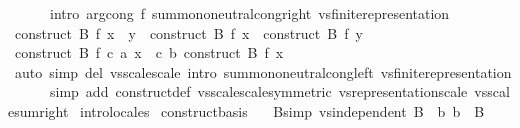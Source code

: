 \begin{isabellebody}
\ \ \ \ \ \ intro{\isacharbang}{\kern0pt}{\isacharcolon}{\kern0pt}\ arg{\isacharunderscore}{\kern0pt}cong{}{\isacharbrackleft}{\kern0pt}\ f{\isacharequal}{\kern0pt}{\isachardoublequoteopen}{\isacharparenleft}{\kern0pt}{\isacharplus}{\kern0pt}{\isacharparenright}{\kern0pt}{\isachardoublequoteclose}{\isacharbrackright}{\kern0pt}\ sum{\isachardot}{\kern0pt}mono{\isacharunderscore}{\kern0pt}neutral{\isacharunderscore}{\kern0pt}cong{\isacharunderscore}{\kern0pt}right\ vs{}{\isachardot}{\kern0pt}finite{\isacharunderscore}{\kern0pt}representation{\isacharparenright}{\kern0pt}\isanewline
\ \ \isamarkupfalse%
\ \isamarkupfalse%
\ {\isachardoublequoteopen}construct\ B\ f\ {\isacharparenleft}{\kern0pt}x\ {\isacharplus}{\kern0pt}\ y{\isacharparenright}{\kern0pt}\ {\isacharequal}{\kern0pt}\ construct\ B\ f\ x\ {\isacharplus}{\kern0pt}\ construct\ B\ f\ y{\isachardoublequoteclose}\ \isacommand{{\isachardot}{\kern0pt}}\isamarkupfalse%
\isanewline
\isanewline
\ \ \isamarkupfalse%
\ {\isachardoublequoteopen}construct\ B\ f\ {\isacharparenleft}{\kern0pt}c\ {\isacharasterisk}{\kern0pt}a\ x{\isacharparenright}{\kern0pt}\ {\isacharequal}{\kern0pt}\ c\ {\isacharasterisk}{\kern0pt}b\ construct\ B\ f\ x{\isachardoublequoteclose}\isanewline
\ \ \ \ \isamarkupfalse%
\ {\isacharparenleft}{\kern0pt}auto\ simp\ del{\isacharcolon}{\kern0pt}\ vs{}{\isachardot}{\kern0pt}scale{\isacharunderscore}{\kern0pt}scale\ intro{\isacharbang}{\kern0pt}{\isacharcolon}{\kern0pt}\ sum{\isachardot}{\kern0pt}mono{\isacharunderscore}{\kern0pt}neutral{\isacharunderscore}{\kern0pt}cong{\isacharunderscore}{\kern0pt}left\ vs{}{\isachardot}{\kern0pt}finite{\isacharunderscore}{\kern0pt}representation\isanewline
\ \ \ \ \ \ simp\ add{\isacharcolon}{\kern0pt}\ construct{\isacharunderscore}{\kern0pt}def\ vs{}{\isachardot}{\kern0pt}scale{\isacharunderscore}{\kern0pt}scale{\isacharbrackleft}{\kern0pt}symmetric{\isacharbrackright}{\kern0pt}\ vs{}{\isachardot}{\kern0pt}representation{\isacharunderscore}{\kern0pt}scale\ vs{}{\isachardot}{\kern0pt}scale{\isacharunderscore}{\kern0pt}sum{\isacharunderscore}{\kern0pt}right{\isacharparenright}{\kern0pt}\isanewline
{}\isamarkupfalse%
\ intro{\isacharunderscore}{\kern0pt}locales%
\endisatagproof
{\isafoldproof}%
%
\isadelimproof
\isanewline
%
\endisadelimproof
\isanewline
{}\isamarkupfalse%
\ construct{\isacharunderscore}{\kern0pt}basis{\isacharcolon}{\kern0pt}\isanewline
\ \ \ B{\isacharbrackleft}{\kern0pt}simp{\isacharbrackright}{\kern0pt}{\isacharcolon}{\kern0pt}\ {\isachardoublequoteopen}vs{}{\isachardot}{\kern0pt}independent\ B{\isachardoublequoteclose}\ \ b{\isacharcolon}{\kern0pt}\ {\isachardoublequoteopen}b\ {\isasymin}\ B{\isachardoublequoteclose}\isanewline

\end{isabellebody}
